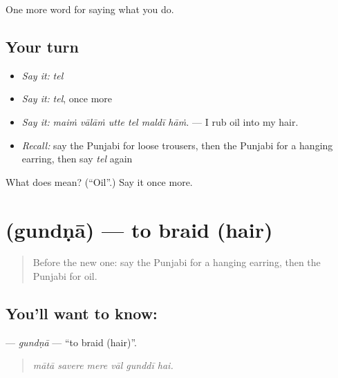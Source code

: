 \begin{grammarlens}[title={What you've built}]
One more word for saying what you do.
\end{grammarlens}

\subsection*{Your turn}
\begin{itemize}
\raggedright
  \item \emph{Say it:} \emph{tel}
  \item \emph{Say it:} \emph{tel}, once more
  \item \emph{Say it:} \emph{maiṁ vālāṁ utte tel maldī hāṁ.} — I rub oil into my hair.
  \item \emph{Recall:} say the Punjabi for loose trousers, then the Punjabi for a hanging earring, then say \emph{tel} again
\end{itemize}

\begin{tcolorbox}[breakable,colback=teal!4,colframe=teal!35!black,title={Before you move on}]
What does  mean? (\textquotedblleft{}Oil\textquotedblright{}.) Say it once more.
\end{tcolorbox}
\section[\texorpdfstring{\pa{ਗੁੰਦਣਾ} (gundṇā)}{ਗੁੰਦਣਾ (gundṇā)}]{ (gundṇā) — to braid (hair)}

\label{lesson:PA-C231-gundna}



\begin{quote}
Before the new one: say the Punjabi for a hanging earring, then the Punjabi for oil.
\end{quote}

\subsection*{You'll want to know: }
\textbf{} — \emph{gundṇā} — \textquotedblleft{}to braid (hair)\textquotedblright{}.

\begin{quote}
     
\end{quote}

\begin{quote}
\emph{mātā savere mere vāl gunddī hai.}
\end{quote}

